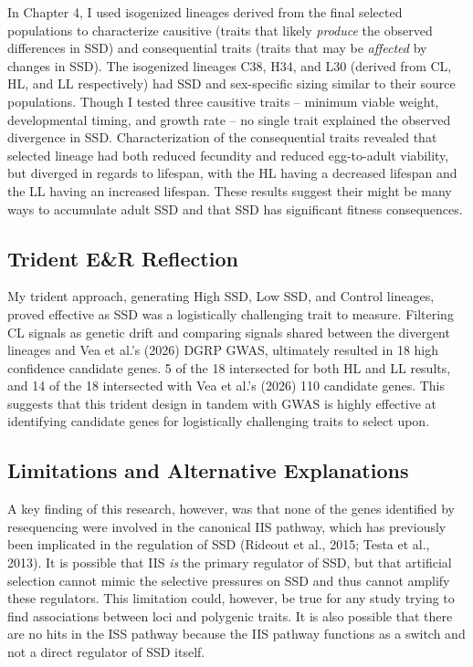 \documentclass[12pt,reqno,oneside]{report}
\begin{document}
In Chapter 4, I used isogenized lineages derived from the final selected populations to characterize causitive (traits that likely \textit{produce} the observed differences in SSD) and consequential traits (traits that may be \textit{affected} by changes in SSD). The isogenized lineages C38, H34, and L30 (derived from CL, HL, and LL respectively) had SSD and sex-specific sizing similar to their source populations. Though I tested three causitive traits -- minimum viable weight, developmental timing, and growth rate -- no single trait explained the observed divergence in SSD. Characterization of the consequential traits revealed that selected lineage had both reduced fecundity and reduced egg-to-adult viability, but diverged in regards to lifespan, with the HL having a decreased lifespan and the LL having an increased lifespan. These results suggest their might be many ways to accumulate adult SSD and that SSD has significant fitness consequences.

\subsection{Trident E\&R Reflection}

My trident approach, generating High SSD, Low SSD, and Control lineages, proved effective as SSD was a logistically challenging trait to measure. Filtering CL signals as genetic drift and comparing signals shared between the divergent lineages and Vea et al.'s (2026) DGRP GWAS, ultimately resulted in 18 high confidence candidate genes. 5 of the 18 intersected for both HL and LL results, and 14 of the 18 intersected with Vea et al.'s (2026) 110 candidate genes. This suggests that this trident design in tandem with GWAS is highly effective at identifying candidate genes for logistically challenging traits to select upon.

\subsection{Limitations and Alternative Explanations}

A key finding of this research, however, was that none of the genes identified by resequencing were involved in the canonical IIS pathway, which has previously been implicated in the regulation of SSD (Rideout et al., 2015; Testa et al., 2013). It is possible that IIS \textit{is} the primary regulator of SSD, but that artificial selection cannot mimic the selective pressures on SSD and thus cannot amplify these regulators. This limitation could, however, be true for any study trying to find associations between loci and polygenic traits. It is also possible that there are no hits in the ISS pathway because the IIS pathway functions as a switch and not a direct regulator of SSD itself.
\end{document}
